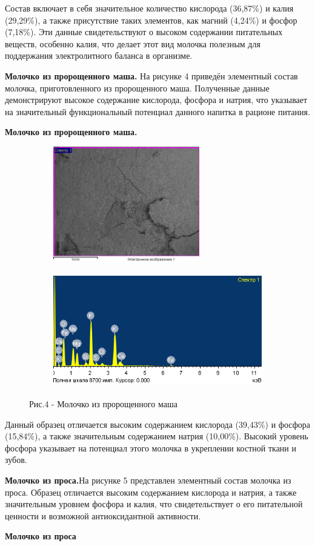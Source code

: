 \begin{multicols}{2}
Состав включает в себя значительное количество кислорода (36,87\%) и
калия (29,29\%), а также присутствие таких элементов, как магний
(4,24\%) и фосфор (7,18\%). Эти данные свидетельствуют о высоком
содержании питательных веществ, особенно калия, что делает этот вид
молочка полезным для поддержания электролитного баланса в организме.

{\bfseries Молочко из пророщенного маша.} На рисунке 4 приведён элементный
состав молочка, приготовленного из пророщенного маша. Полученные данные
демонстрируют высокое содержание кислорода, фосфора и натрия, что
указывает на значительный функциональный потенциал данного напитка в
рационе питания.
\end{multicols}

{\bfseries Молочко из пророщенного маша.}
\begin{figure}[H]
	\centering
	\begin{subfigure}{0.4\textwidth}
		\centering
		\includegraphics[height=5cm]{media/pish/image51}
	\end{subfigure}
	\hfill
	\begin{subfigure}{0.55\textwidth}
		\centering
		\includegraphics[height=5cm]{media/pish/image50}
	\end{subfigure}
	\caption*{Рис.4 - Молочко из пророщенного маша}
\end{figure}

\begin{multicols}{2}
Данный образец отличается высоким содержанием кислорода (39,43\%) и фосфора
(15,84\%), а также значительным содержанием натрия (10,00\%). Высокий
уровень фосфора указывает на потенциал этого молочка в укреплении
костной ткани и зубов.

{\bfseries Молочко из проса.}На рисунке 5 представлен элементный состав
молочка из проса. Образец отличается высоким содержанием кислорода и
натрия, а также значительным уровнем фосфора и калия, что
свидетельствует о его питательной ценности и возможной антиоксидантной
активности.

{\bfseries Молочко из проса}
\end{multicols}

